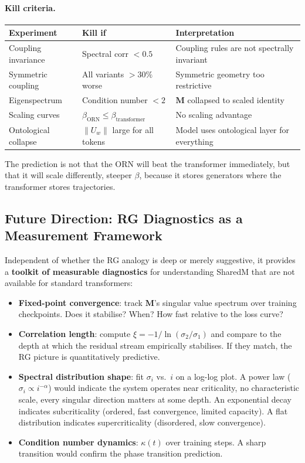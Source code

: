 \documentclass[11pt, a4paper]{article}
\newcommand{\M}{\mathbf{M}}
\theoremstyle{remark}
\begin{document}
\paragraph{Kill criteria.}

\begin{center}\small
\begin{tabular}{@{}llp{6cm}@{}}
\toprule
\textbf{Experiment} & \textbf{Kill if} & \textbf{Interpretation} \\
\midrule
Coupling invariance & Spectral corr $< 0.5$ & Coupling rules are not spectrally invariant \\
Symmetric coupling & All variants $>30\%$ worse & Symmetric geometry too restrictive \\
Eigenspectrum & Condition number $< 2$ & $\M$ collapsed to scaled identity \\
Scaling curves & $\beta_{\text{ORN}} \leq \beta_{\text{transformer}}$ & No scaling advantage \\
Ontological collapse & $\|U_w\|$ large for all tokens & Model uses ontological layer for everything \\
\bottomrule
\end{tabular}
\end{center}

The prediction is not that the ORN will beat the transformer immediately, but that it will scale differently, steeper $\beta$, because it stores generators where the transformer stores trajectories.


\subsection{Future Direction: RG Diagnostics as a Measurement Framework}

Independent of whether the RG analogy is deep or merely suggestive, it provides a \textbf{toolkit of measurable diagnostics} for understanding SharedM that are not available for standard transformers:
\begin{itemize}[nosep]
    \item \textbf{Fixed-point convergence}: track $\M$'s singular value spectrum over training checkpoints.
    Does it stabilise? When? How fast relative to the loss curve?
    \item \textbf{Correlation length}: compute $\xi = -1/\ln(\sigma_2/\sigma_1)$ and compare to the depth at which the residual stream empirically stabilises.
    If they match, the RG picture is quantitatively predictive.
    \item \textbf{Spectral distribution shape}: fit $\sigma_i$ vs.\ $i$ on a log-log plot.
    A power law ($\sigma_i \propto i^{-\alpha}$) would indicate the system operates near criticality, no characteristic scale, every singular direction matters at some depth.
    An exponential decay indicates subcriticality (ordered, fast convergence, limited capacity).
    A flat distribution indicates supercriticality (disordered, slow convergence).
    \item \textbf{Condition number dynamics}: $\kappa(t)$ over training steps.
    A sharp transition would confirm the phase transition prediction.
\end{itemize}
\end{document}
